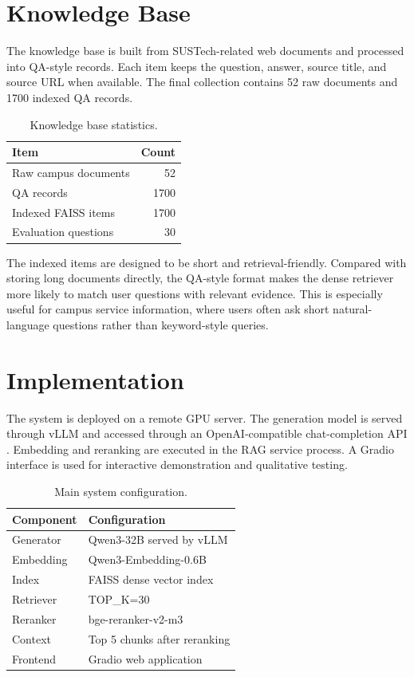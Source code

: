 \section{Knowledge Base}

The knowledge base is built from SUSTech-related web documents and processed into QA-style records. Each item keeps the question, answer, source title, and source URL when available. The final collection contains 52 raw documents and 1700 indexed QA records.

\begin{table}[t]
\centering
\caption{Knowledge base statistics.}
\label{tab:data}
\begin{tabular}{lr}
\toprule
Item & Count \\
\midrule
Raw campus documents & 52 \\
QA records & 1700 \\
Indexed FAISS items & 1700 \\
Evaluation questions & 30 \\
\bottomrule
\end{tabular}
\end{table}

The indexed items are designed to be short and retrieval-friendly. Compared with storing long documents directly, the QA-style format makes the dense retriever more likely to match user questions with relevant evidence. This is especially useful for campus service information, where users often ask short natural-language questions rather than keyword-style queries.

\section{Implementation}

The system is deployed on a remote GPU server. The generation model is served through vLLM and accessed through an OpenAI-compatible chat-completion API \citep{kwon2023vllm}. Embedding and reranking are executed in the RAG service process. A Gradio interface is used for interactive demonstration and qualitative testing.

\begin{table}[t]
\centering
\caption{Main system configuration.}
\label{tab:config}
\begin{tabularx}{\columnwidth}{lY}
\toprule
Component & Configuration \\
\midrule
Generator & Qwen3-32B served by vLLM \\
Embedding & Qwen3-Embedding-0.6B \\
Index & FAISS dense vector index \citep{johnson2019faiss} \\
Retriever & TOP\_K=30 \\
Reranker & bge-reranker-v2-m3 \\
Context & Top 5 chunks after reranking \\
Frontend & Gradio web application \\
\bottomrule
\end{tabularx}
\end{table}

